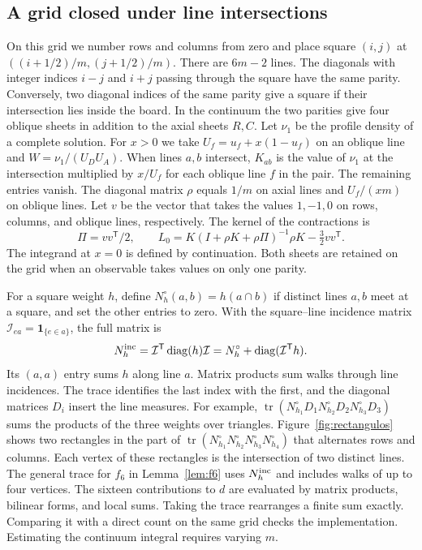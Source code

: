 \subsection{A grid closed under line intersections}
On this grid we number rows and columns from zero and place square $(i,j)$ at
$((i+1/2)/m,(j+1/2)/m)$. There are
$6m-2$ lines. The diagonals with integer indices $i-j$ and $i+j$ passing through the square have the same
parity. Conversely, two diagonal indices of the same parity give a square if their intersection lies
inside the board. In the continuum the two parities give four oblique sheets in addition to the axial
sheets $R,C$. Let $\nu_1$ be the profile density of a complete solution. For $x>0$ we take
$U_f=u_f+x(1-u_f)$ on an oblique line and $W=\nu_1/(U_DU_A)$. When lines $a,b$ intersect, $K_{ab}$ is the
value of $\nu_1$ at the intersection multiplied by $x/U_f$ for each oblique line $f$ in the pair. The
remaining entries vanish. The diagonal matrix $\rho$ equals $1/m$ on axial lines and $U_f/(xm)$ on
oblique lines. Let $v$ be the vector that takes the values $1,-1,0$ on rows, columns, and oblique lines,
respectively. The kernel of the contractions is
\[
 \Pi=vv^{\mathsf T}/2,\qquad
 L_0=K(I+\rho K+\rho\Pi)^{-1}\rho K-\tfrac32vv^{\mathsf T}.
\]
The integrand at $x=0$ is defined by continuation. Both sheets are retained on the grid when an
observable takes values on only one parity.

For a square weight $h$, define $N_h^\circ(a,b)=h(a\cap b)$ if distinct lines $a,b$ meet at a square, and
set the other entries to zero. With the square--line incidence matrix $\mathcal I_{ea}=\mathbf 1_{\{e\in
a\}}$, the full matrix is
\[
 N_h^{\rm inc}=\mathcal I^{\mathsf T}\operatorname{diag}(h)\mathcal I
              =N_h^\circ+\operatorname{diag}(\mathcal I^{\mathsf T}h).
\]
Its $(a,a)$ entry sums $h$ along line $a$. Matrix products sum walks through line incidences. The trace
identifies the last index with the first, and the diagonal matrices $D_i$ insert the line measures. For
example, $\operatorname{tr}(N_{h_1}^\circ D_1
N_{h_2}^\circ D_2 N_{h_3}^\circ D_3)$ sums the products of the three weights over triangles.
Figure~\ref{fig:rectangulos} shows two rectangles in the part of $\operatorname{tr}(N_{h_1}^\circ
N_{h_2}^\circ N_{h_3}^\circ N_{h_4}^\circ)$ that alternates rows and columns. Each vertex of these
rectangles is the intersection of two distinct lines. The general trace for $f_6$ in Lemma~\ref{lem:f6}
uses $N_h^{\rm inc}$ and includes walks of up to four vertices. The sixteen contributions to $d$ are
evaluated by matrix products, bilinear forms, and local sums. Taking the trace rearranges a finite sum
exactly. Comparing it with a direct count on the same grid checks the implementation. Estimating the
continuum integral requires varying $m$.


